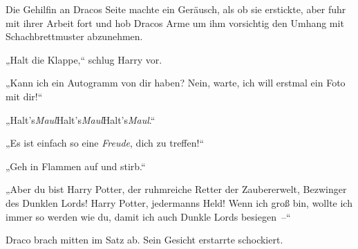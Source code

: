 Die Gehilfin an Dracos Seite machte ein Geräusch, als ob sie erstickte, aber fuhr mit ihrer Arbeit fort und hob Dracos Arme um ihm vorsichtig den Umhang mit Schachbrettmuster abzunehmen.

„Halt die Klappe,“ schlug Harry vor.

„Kann ich ein Autogramm von dir haben? Nein, warte, ich will erstmal ein Foto mit dir!“

„Halt's\emph{Maul}Halt's\emph{Maul}Halt's\emph{Maul}.“

„Es ist einfach so eine \emph{Freude}, dich zu treffen!“

„Geh in Flammen auf und stirb.“

„Aber du bist Harry Potter, der ruhmreiche Retter der Zaubererwelt, Bezwinger des Dunklen Lords! Harry Potter, jedermanns Held! Wenn ich groß bin, wollte ich immer so werden wie du, damit ich auch Dunkle Lords besiegen –“

Draco brach mitten im Satz ab. Sein Gesicht erstarrte schockiert.

